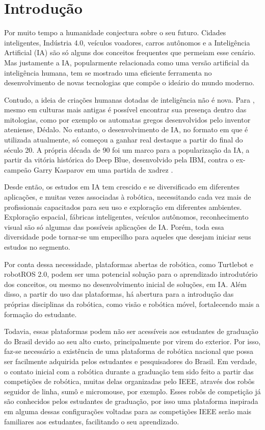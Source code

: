 \chapter{Introdução}
\label{chap:intro}

Por muito tempo a humanidade conjectura sobre o seu futuro. Cidades inteligentes, Indústria 4.0, veículos voadores, carros autônomos e a Inteligência Artificial (IA) são só alguns dos conceitos frequentes que permeiam esse cenário. Mas justamente a IA, popularmente relacionada como uma versão artificial da inteligência humana, tem se mostrado uma eficiente ferramenta no desenvolvimento de novas tecnologias que compõe o ideário do mundo moderno.

Contudo, a ideia de criações humanas dotadas de inteligência não é nova. Para , mesmo em culturas mais antigas é possível encontrar sua presença dentro das mitologias, como por exemplo os automatas gregos desenvolvidos pelo inventor ateniense, Dédalo. No entanto, o desenvolvimento de IA, no formato em que é utilizada atualmente, só começou a ganhar real destaque a partir do final do século 20. A própria década de 90 foi um marco para a popularização da IA, a partir da vitória histórica do Deep Blue, desenvolvido pela IBM, contra o ex-campeão Garry Kasparov em uma partida de xadrez \cite{McCorduck2004}. 

Desde então, os estudos em IA tem crescido e se diversificado em diferentes aplicações, e muitas vezes associadas à robótica, necessitando cada vez mais de profissionais capacitados para seu uso e exploração em diferentes ambientes. Exploração espacial, fábricas inteligentes, veículos autônomos, reconhecimento visual são só algumas das possíveis aplicações de IA. Porém, toda essa diversidade pode tornar-se um empecilho para aqueles que desejam iniciar seus estudos no segmento.

Por conta dessa necessidade, plataformas abertas de robótica, como Turtlebot e robotROS 2.0, podem ser uma potencial solução para o aprendizado introdutório dos conceitos, ou mesmo no desenvolvimento inicial de soluções, em IA. Além disso, a partir do uso das plataformas, há abertura para a introdução das próprias disciplinas da robótica, como visão e robótica móvel, fortalecendo mais a formação do estudante.

Todavia, essas plataformas podem não ser acessíveis aos estudantes de graduação do Brasil devido ao seu alto custo, principalmente por virem do exterior. Por isso, faz-se necessário a existência de uma plataforma de robótica nacional que possa ser facilmente adquirida pelos estudantes e pesquisadores do Brasil. Em verdade, o contato inicial com a robótica durante a graduação tem sido feito a partir das competições de robótica, muitas delas organizadas pelo IEEE, através dos robôs seguidor de linha, sumô e micromouse, por exemplo. Esses robôs de competição já são conhecidos pelos estudantes de graduação, por isso uma plataforma inspirada em alguma dessas configurações voltadas para as competições IEEE serão mais familiares aos estudantes, facilitando o seu aprendizado. 

